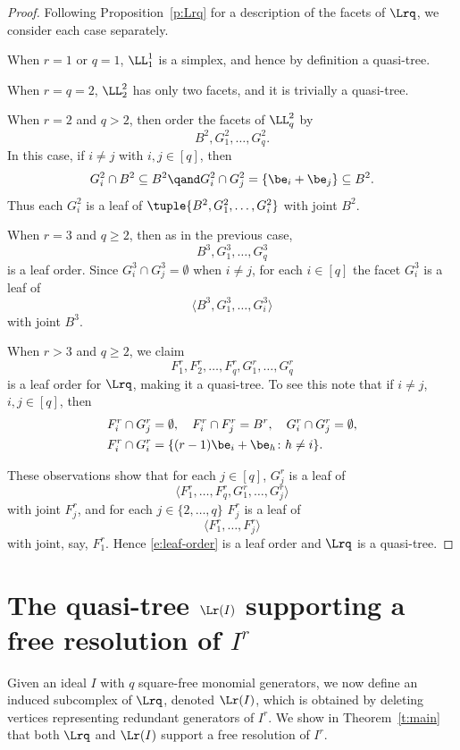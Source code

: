 \begin{proof}    Following Proposition~\ref{p:Lrq} for a description of the
facets of $\Lrq$, we consider each case separately.

When $r=1$ or $q=1$, $\LL^1_1$ is a simplex,
and hence by definition a quasi-tree.

When $r = q = 2$,  $\LL^2_2$ has only two
facets, and it is trivially a quasi-tree.

When $r=2$ and $q > 2$, then  order the
facets of $\LL^2_q$ by $$B^2, G^2_1, \ldots, G^2_q.$$ In this case,
if $i \neq j$ with $i,j \in [q]$, then
$$G^2_i \cap B^2 \subseteq B^2\qand G^2_i \cap G^2_j= \{\be_i + \be_j\}
\subseteq B^2.$$ Thus each $G^2_i$ is a leaf of $\tuple{B^2, G^2_1,
\ldots, G^2_i}$ with joint $B^2$.


When $r = 3$ and $q \geq 2$, then as in the previous case,
$$B^3, G^3_1, \ldots, G^3_q$$ is
a leaf order.  Since $G^3_i \cap G^3_j= \emptyset$ when $i
\neq j$, for each $i \in [q]$ the facet $G^3_i$ is a leaf of $$\langle B^3,
G^3_1, \ldots, G^3_i \rangle$$ with joint $B^3$.

When $r>3$ and $q \geq 2$, we claim
\begin{equation}\label{e:leaf-order}
F^r_1, F^r_2, \dots, F^r_q, G^r_1,\dots, G^r_q
\end{equation} is a leaf order for $\Lrq$, making it a quasi-tree.
To see this note that if $i\neq j$, $i,j\in [q]$, then
\begin{align*}
F^r_i\cap G^r_j& =\emptyset, \quad  F^r_i\cap F^r_j=B^r, \quad
G^r_i\cap G^r_j= \emptyset,  \\ 
F^r_i \cap G^r_i & = \{(r-1)\be_i + \be_h \colon h \neq i \}.
\end{align*}

These observations show that for each $j\in [q]$, $G^r_j$ is a leaf
of $$\langle F^r_1, \dots, F^r_q, G^r_1, \ldots, G^r_{j}\rangle$$
with joint $F^r_{j}$, and for each $j\in \{2,\ldots, q\}$ $F^r_j$
is a leaf of $$\langle F^r_1, \ldots, F^r_j\rangle$$ with
joint, say, $F^r_{1}$. Hence \eqref{e:leaf-order} is a leaf order
and $\Lrq$ is a quasi-tree.
\end{proof}

\section{The quasi-tree \texorpdfstring{$\Lr(I)$}{Lr(I)} supporting a free resolution of \texorpdfstring{$I^r$}{Ir}}
\label{sec:LrI}


Given an ideal $I$ with $q$ square-free monomial generators, we now define an induced
subcomplex of $\Lrq$, denoted $\Lr(I)$, which is obtained
by deleting vertices representing redundant generators of $I^r$.  We
show in Theorem~\ref{t:main} that both $\Lrq$ and $\Lr(I)$ support a free
resolution of $I^r$.

